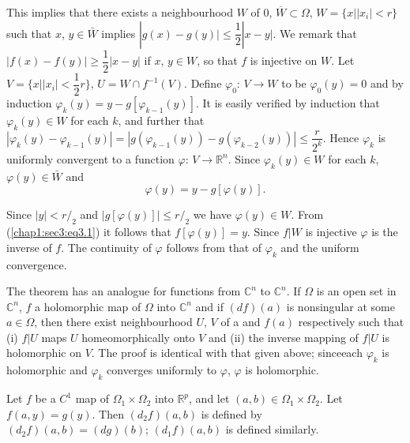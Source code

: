 This implies that there exists a neighbourhood $W$ of $0$,
$\overline{W}\subset \Omega$,
$W= \{ x \big| | x_i | < r \}$ such that $x$, $y \in \bar{W}$
implies $|g(x) - g(y) \big| \leq \dfrac{1}{2}| x - y|$. We remark that
$|f(x) - f(y)| \geq \dfrac{1}{2} | x-y |$ if $x$, $y \in W$, so that
$f$ is injective on $W$. Let $V= \{ x \big| |x_i| < \dfrac{1}{2} r
\}$, $U = W \cap f^{-1} (V)$. Define $\varphi_0$: $V \to W$ to be
$\varphi_0 (y) =0$ and by induction $\varphi_k (y) = y-g [
  \varphi_{k-1} (y)]$. It is easily verified by induction that
$\varphi_k (y) \in W$ for each $k$, and further that $| \varphi_k (y)
- \varphi_{k-1} (y)| = | g( \varphi_{k-1} (y)) - g(\varphi_{k-2} (y))
| \leq \dfrac{r}{2^k}$. Hence $\varphi_k$ is uniformly convergent to a
function $\varphi$: $V \to \mathbb{R}^n$. Since $\varphi_k (y) \in W$
for each $k$, $\varphi (y) \in \bar{W}$ and  
\begin{equation*}
\varphi (y) = y-g [ \varphi (y)]. \tag{3.1}\label{chap1:sec3:eq3.1}
\end{equation*}

Since $|y | < r/_2$ and $\big| g [\varphi (y)] \big| \leq r/_2$ we
have $\varphi (y) \in W$. From (\ref{chap1:sec3:eq3.1}) it follows that $f[\varphi
  (y)]= y$. Since $f \big| W$ is injective $\varphi$ is the inverse of
$f$. The continuity of $\varphi$ follows from that of $\varphi_k$ and
the uniform convergence. 

\begin{remark*}
  The theorem has an analogue for functions from $\mathbb{C}^n$ to
  $\mathbb{C}^n$. If $\Omega$ is an open set in $\mathbb{C}^n$, $f$ a
  holomorphic map of $\Omega$ into $\mathbb{C}^n$ and  if $(df) (a)$
  is nonsingular at some $a \in \Omega$, then there exist
  neighbourhood $U$, $V$ of a and $f(a)$ respectively such that (i) $f 
  \big| U$ maps $U$ homeomorphically onto $V$ and (ii) the inverse
  mapping of $f \big| U$ is holomorphic on $V$. The proof is identical
  with that given above; since\pageoriginale each $\varphi_k$ is holomorphic and
  $\varphi_k$ converges uniformly to $\varphi$, $\varphi$ is
  holomorphic. 
\end{remark*}

\begin{defi*}
  Let $f$ be a $C^1$ map of $\Omega_1 \times \Omega_2$ into
  $\mathbb{R}^p$, and let $(a, b) \in \Omega_1 \times \Omega_2$. Let
  $f(a, y) = g(y)$. Then $(d_2 f) (a, b)$ is defined by $(d_2 f) (a,
  b)= (dg) (b)$; $(d_1 f) (a, b)$ is defined similarly. 
\end{defi*}

